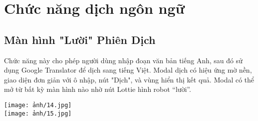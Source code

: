 \section{Chức năng dịch ngôn ngữ}
\subsection{Màn hình "Lười" Phiên Dịch}
Chức năng này cho phép người dùng nhập đoạn văn bản tiếng Anh, sau đó sử dụng Google Translator để dịch sang tiếng Việt. Modal dịch có hiệu ứng mờ nền, giao diện đơn giản với ô nhập, nút "Dịch", và vùng hiển thị kết quả. Modal có thể mở từ bất kỳ màn hình nào nhờ nút Lottie hình robot “lười”.
\begin{center}
\texttt{[image: ảnh/14.jpg]}\\
\texttt{[image: ảnh/15.jpg]}
\end{center}



